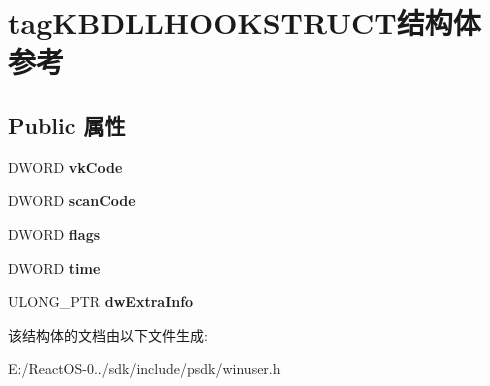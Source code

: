 \hypertarget{structtag_k_b_d_l_l_h_o_o_k_s_t_r_u_c_t}{}\section{tag\+K\+B\+D\+L\+L\+H\+O\+O\+K\+S\+T\+R\+U\+C\+T结构体 参考}
\label{structtag_k_b_d_l_l_h_o_o_k_s_t_r_u_c_t}
\subsection*{Public 属性}
\begin{DoxyCompactItemize}
\item 
\mbox{\label{structtag_k_b_d_l_l_h_o_o_k_s_t_r_u_c_t_af78b6cffaaa1f32fd90d0854b6bf9001}} 
D\+W\+O\+RD {\bfseries vk\+Code}
\item 
\mbox{\label{structtag_k_b_d_l_l_h_o_o_k_s_t_r_u_c_t_a0529a8b06b0a1e95ec2632de781c0142}} 
D\+W\+O\+RD {\bfseries scan\+Code}
\item 
\mbox{\label{structtag_k_b_d_l_l_h_o_o_k_s_t_r_u_c_t_a7ab8a77fa0dbd02f3fca37e9fd91f8d7}} 
D\+W\+O\+RD {\bfseries flags}
\item 
\mbox{\label{structtag_k_b_d_l_l_h_o_o_k_s_t_r_u_c_t_a8f6e7be3a750050658ef5770b1ef3521}} 
D\+W\+O\+RD {\bfseries time}
\item 
\mbox{\label{structtag_k_b_d_l_l_h_o_o_k_s_t_r_u_c_t_ac3ca708a14ced7e0f263081301dd9d8d}} 
U\+L\+O\+N\+G\+\_\+\+P\+TR {\bfseries dw\+Extra\+Info}
\end{DoxyCompactItemize}


该结构体的文档由以下文件生成\+:\begin{DoxyCompactItemize}
\item 
E\+:/\+React\+O\+S-\/0../sdk/include/psdk/winuser.\+h\end{DoxyCompactItemize}
